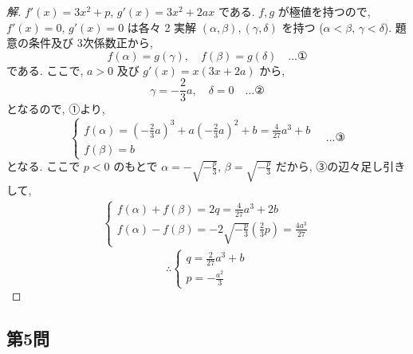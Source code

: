 \documentclass[../main.tex]{subfiles}
\begin{document}
\begin{proof}[解]
  $f'(x) = 3x^2 + p, \, g'(x) = 3x^2 + 2ax$ である. $f, g$ が極値を持つので,
  $f'(x) = 0, \, g'(x) = 0$ は各々 2 実解 $(\alpha, \beta), (\gamma, \delta)$ を持つ ($\alpha < \beta, \, \gamma < \delta$).
  題意の条件及び 3次係数正から,
  \begin{equation}
    f(\alpha) = g(\gamma), \quad f(\beta) = g(\delta) \quad \dots \text{①}
  \end{equation}
  である. ここで, $a > 0$ 及び $g'(x) = x(3x+2a)$ から,
  \begin{equation}
    \gamma = -\frac{2}{3}a, \quad \delta = 0 \quad \dots \text{②}
  \end{equation}
  となるので, ①より,
  \begin{equation}
    \begin{cases}
      f(\alpha) = (-\frac{2}{3}a)^3 + a(-\frac{2}{3}a)^2 + b = \frac{4}{27}a^3 + b \\
      f(\beta) = b
    \end{cases} \quad \dots \text{③}
  \end{equation}
  となる. ここで $p < 0$ のもとで $\alpha = -\sqrt{-\frac{p}{3}}, \, \beta = \sqrt{-\frac{p}{3}}$ だから, ③の辺々足し引きして,
  \begin{align*}
    \begin{cases}
      f(\alpha) + f(\beta) = 2q = \frac{4}{27}a^3 + 2b \\
      f(\alpha) - f(\beta) = -2\sqrt{-\frac{p}{3}} (\frac{2}{3}p) = \frac{4a^3}{27}
    \end{cases}
  \end{align*}
  \[ \therefore
    \begin{cases} q = \frac{2}{27}a^3 + b \\ p = -\frac{a^2}{3}
  \end{cases} \]
\end{proof}

\newpage

\subsection*{第5問}
\end{document}
